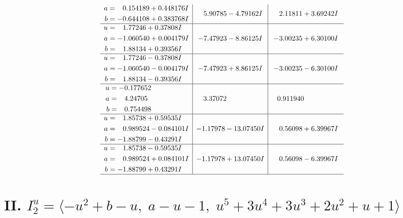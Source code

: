 \documentclass[1p]{elsarticle_modified}
\theoremstyle{definition}
\begin{document}
$$\begin{array}{c|c|c}
\begin{aligned}
a &= \phantom{-}0.154189 + 0.448176 I \\
b &= -0.644108 + 0.383768 I\end{aligned}
 & \phantom{-}5.90785 - 4.79162 I & \phantom{-}2.11811 + 3.69242 I \\ \hline\begin{aligned}
u &= \phantom{-}1.77246 + 0.37808 I \\
a &= -1.060540 + 0.004179 I \\
b &= \phantom{-}1.88134 + 0.39356 I\end{aligned}
 & -7.47923 - 8.86125 I & -3.00235 + 6.30100 I \\ \hline\begin{aligned}
u &= \phantom{-}1.77246 - 0.37808 I \\
a &= -1.060540 - 0.004179 I \\
b &= \phantom{-}1.88134 - 0.39356 I\end{aligned}
 & -7.47923 + 8.86125 I & -3.00235 - 6.30100 I \\ \hline\begin{aligned}
u &= -0.177652\phantom{ +0.000000I} \\
a &= \phantom{-}4.24705\phantom{ +0.000000I} \\
b &= \phantom{-}0.754498\phantom{ +0.000000I}\end{aligned}
 & \phantom{-}3.37072\phantom{ +0.000000I} & \phantom{-}0.911940\phantom{ +0.000000I} \\ \hline\begin{aligned}
u &= \phantom{-}1.85738 + 0.59535 I \\
a &= \phantom{-}0.989524 - 0.084101 I \\
b &= -1.88799 - 0.43291 I\end{aligned}
 & -1.17978 - 13.07450 I & \phantom{-}0.56098 + 6.39967 I \\ \hline\begin{aligned}
u &= \phantom{-}1.85738 - 0.59535 I \\
a &= \phantom{-}0.989524 + 0.084101 I \\
b &= -1.88799 + 0.43291 I\end{aligned}
 & -1.17978 + 13.07450 I & \phantom{-}0.56098 - 6.39967 I\\
 \hline 
 \end{array}$$\newpage\newpage\renewcommand{\arraystretch}{1}
\centering \section*{II. $I^u_{2}= \langle - u^2+b- u,\;a- u-1,\;u^5+3 u^4+3 u^3+2 u^2+u+1 \rangle$}
\end{document}
